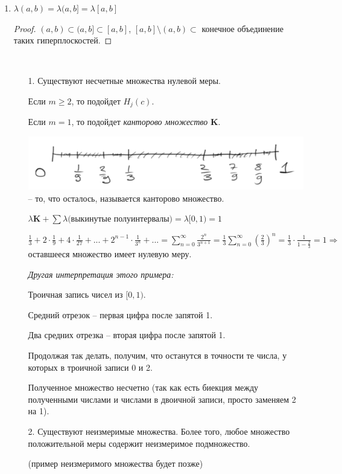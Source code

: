 \begin{enumerate}
    \item $\lambda (a, b) =\lambda (a, b] = \lambda [a, b]$
    
    \begin{proof}
        $(a, b)\subset (a, b]\subset [a, b]$, $[a, b]\setminus (a, b) \subset$ конечное 
        объединение таких гиперплоскостей.
    \end{proof}

    \begin{remark}~
        \begin{enumerate}
            \item[1.] Существуют несчетные множества нулевой меры.
            
            Если $m\geq 2$, то подойдет $H_j(c)$.

            Если $m= 1$, то подойдет \textit{канторово множество} $\mathbf{K}$.

            \includegraphics[width=0.35\linewidth]{images/23-09-21-4.png} – то, что осталось, называется канторово множество.

            $\lambda \mathbf{K}+\sum \lambda($выкинутые полуинтервалы$)=\lambda [0, 1)=1$

            $\frac{1}{3}+2\cdot\frac{1}{9}+4\cdot\frac{1}{27}+...+2^{n-1}\cdot\frac{1}{3^n}+...=
            \sum\limits_{n=0}^\infty \frac{2^n}{3^{n+1}}=\frac{1}{3}\sum\limits_{n=0}^\infty (\frac{2}{3})^n=
            \frac{1}{3}\cdot\frac{1}{1-\frac{2}{3}}=1\Rightarrow$ оставшееся множество имеет нулевую меру.

            \textit{Другая интерпретация этого примера:}

            Троичная запись чисел из $[0, 1)$. 
            
            Средний отрезок – первая цифра после запятой 1.

            Два средних отрезка – вторая цифра после запятой 1.

            Продолжая так делать, получим, что останутся в точности те числа, у которых в троичной записи 0 и 2.

            Полученное множество несчетно (так как есть биекция между полученными числами и числами в двоичной записи, 
            просто заменяем 2 на 1).

            \item[2.] Существуют неизмеримые множества. Более того, любое множество положительной
            меры содержит неизмеримое подмножество.

            (пример неизмеримого множества будет позже)
        \end{enumerate}
    \end{remark}
\end{enumerate}

